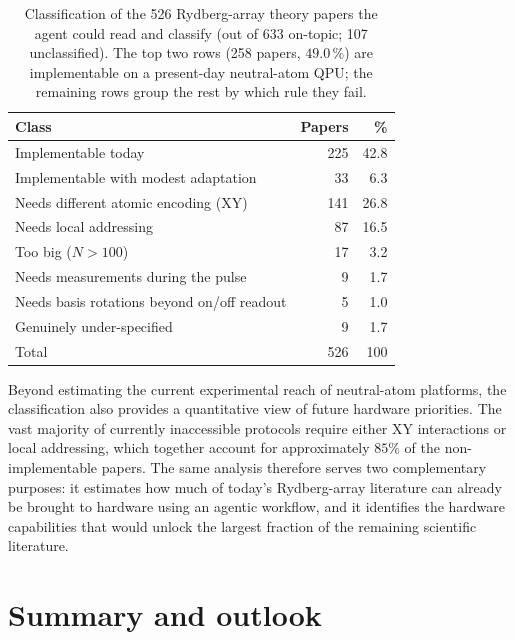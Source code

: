 \documentclass[aps,pra,reprint,amssymb,superscriptaddress,nofootinbib,floatfix]{revtex4-2}
\begin{document}
\begin{table}[t]
  \centering
  \caption{Classification of the 526 Rydberg-array theory papers the
    agent could read and classify (out of 633 on-topic; 107
    unclassified). The top two rows (258 papers, $49.0\,\%$) are
    implementable on a present-day neutral-atom QPU; the remaining rows
    group the rest by which rule they fail.}
  \label{tab:corpus}
  \begin{tabular}{lrr}
    \toprule
    Class & Papers & \% \\
    \midrule
    Implementable today                              & 225 & 42.8 \\
    Implementable with modest adaptation             &  33 &  6.3 \\
    \midrule
    Needs different atomic encoding (XY)             & 141 & 26.8 \\
    Needs local addressing                           &  87 & 16.5 \\
    Too big ($N > 100$)                              &  17 &  3.2 \\
    Needs measurements during the pulse              &   9 &  1.7 \\
    Needs basis rotations beyond on/off readout      &   5 &  1.0 \\
    Genuinely under-specified                        &   9 &  1.7 \\
    \midrule
    Total                                            & 526 & 100  \\
    \bottomrule
  \end{tabular}
\end{table}


Beyond estimating the current experimental reach of neutral-atom platforms, the classification also provides a quantitative view of future hardware priorities. The vast majority of currently inaccessible protocols require either XY interactions or local addressing, which together account for approximately $85\%$ of the non-implementable papers. The same analysis therefore serves two complementary purposes: it estimates how much of today's Rydberg-array literature can already be brought to hardware using an agentic workflow, and it identifies the hardware capabilities that would unlock the largest fraction of the remaining scientific literature.

\section{Summary and outlook}\label{sec:ccl}
\end{document}
